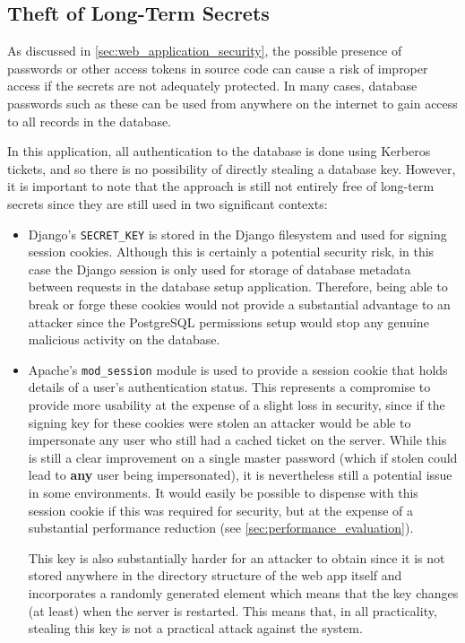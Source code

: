 \documentclass[12pt]{report}
\begin{document}
\subsection{Theft of Long-Term Secrets}
As discussed in \autoref{sec:web_application_security}, the possible presence of passwords or other access tokens in source code can cause a risk of improper access if the secrets are not adequately protected. In many cases, database passwords such as these can be used from anywhere on the internet to gain access to all records in the database.

In this application, all authentication to the database is done using Kerberos tickets, and so there is no possibility of directly stealing a database key. However, it is important to note that the approach is still not entirely free of long-term secrets since they are still used in two significant contexts:
\begin{itemize}
\item
  Django's \verb+SECRET_KEY+ is stored in the Django filesystem and used for signing session cookies. Although this is certainly a potential security risk, in this case the Django session is only used for storage of database metadata between requests in the database setup application. Therefore, being able to break or forge these cookies would not provide a substantial advantage to an attacker since the PostgreSQL permissions setup would stop any genuine malicious activity on the database.
\item
  Apache's \verb+mod_session+ module is used to provide a session cookie that holds details of a user's authentication status. This represents a compromise to provide more usability at the expense of a slight loss in security, since if the signing key for these cookies were stolen an attacker would be able to impersonate any user who still had a cached ticket on the server. While this is still a clear improvement on a single master password (which if stolen could lead to \textbf{any} user being impersonated), it is nevertheless still a potential issue in some environments. It would easily be possible to dispense with this session cookie if this was required for security, but at the expense of a substantial performance reduction (see \autoref{sec:performance_evaluation}).

  This key is also substantially harder for an attacker to obtain since it is not stored anywhere in the directory structure of the web app itself and incorporates a randomly generated element which means that the key changes (at least) when the server is restarted. This means that, in all practicality, stealing this key is not a practical attack against the system.
\end{itemize}
\end{document}
